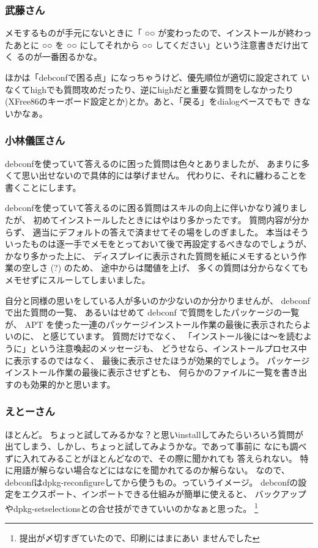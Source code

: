 \documentclass[mingoth,a4paper]{jsarticle}
\begin{document}
\subsubsection{武藤さん}

メモするものが手元にないときに「 ○○ が変わったので、インストールが終わっ
たあとに ○○ を ○○ にしてそれから ○○ してください」という注意書きだけ出てく
るのが一番困るかな。

ほかは「debconfで困る点」になっちゃうけど、優先順位が適切に設定されて
いなくてhighでも質問攻めだったり、逆にhighだと重要な質問をしなかったり
(XFree86のキーボード設定とか)とか。あと、「戻る」をdialogベースでもで
きないかなぁ。

\subsubsection{小林儀匡さん}

debconfを使っていて答えるのに困った質問は色々とありましたが、
あまりに多くて思い出せないので具体的には挙げません。
代わりに、それに纏わることを書くことにします。

debconfを使っていて答えるのに困る質問はスキルの向上に伴いかなり減りましたが、
初めてインストールしたときにはやはり多かったです。
質問内容が分からず、
適当にデフォルトの答えで済ませてその場をしのぎました。
本当はそういったものは逐一手でメモをとっておいて後で再設定するべきなのでしょうが、
かなり多かった上に、
ディスプレイに表示された質問を紙にメモするという作業の空しさ (?) のため、
途中からは閾値を上げ、
多くの質問は分からなくてもメモせずにスルーしてしまいました。

自分と同様の思いをしている人が多いのか少ないのか分かりませんが、
debconf で出た質問の一覧、
あるいはせめて debconf で質問をしたパッケージの一覧が、
APT を使った一連のパッケージインストール作業の最後に表示されたらよいのに、
と感じています。
質問だけでなく、
「インストール後には〜を読むように」という注意喚起のメッセージも、
どうせなら、インストールプロセス中に表示するのではなく、
最後に表示させたほうが効果的でしょう。
パッケージインストール作業の最後に表示させずとも、
何らかのファイルに一覧を書き出すのも効果的かと思います。

\subsubsection{えとーさん}

ほとんど。
ちょっと試してみるかな？と思いinstallしてみたらいろいろ質問が
出てしまう、しかし、ちょっと試してみようかな。であって事前に
なにも調べずに入れてみることがほとんどなので、その際に聞かれても
答えられない。
特に用語が解らない場合などにはなにを聞かれてるのか解らない。
なので、debconfはdpkg-reconfigureしてから使うもの。っていうイメージ。
debconfの設定をエクスポート、インポートできる仕組みが簡単に使えると、
バックアップやdpkg-setselectionsとの合せ技ができていいのかなぁと思った。
\footnote{提出が〆切すぎていたので、印刷にはまにあい
   ませんでした}
\end{document}
